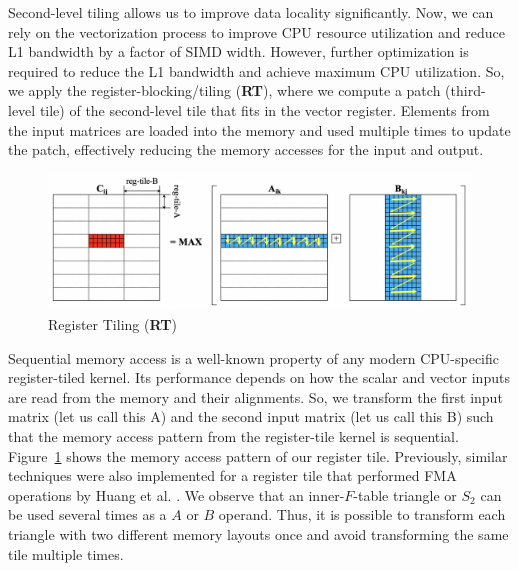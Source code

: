 
Second-level tiling allows us to improve data locality significantly. Now, we can rely on the vectorization process to improve CPU resource utilization and reduce L1 bandwidth by a factor of SIMD width. However, further optimization is required to reduce the L1 bandwidth and achieve maximum CPU utilization. So, we apply the register-blocking/tiling (\textbf{RT}), where we compute a patch (third-level tile) of the second-level tile that fits in the vector register. Elements from the input matrices are loaded into the memory and used multiple times to update the patch, effectively reducing the memory accesses for the input and output.

\begin{figure}[htbp]
\centerline{\includegraphics[scale=0.25, trim=5 5 5 5,clip]{content/figures/register_tile.png}}
\caption{Register Tiling (\textbf{RT})}
\label{fig:regiser_tile}
\end{figure}

Sequential memory access is a well-known property of any modern CPU-specific register-tiled kernel. Its performance depends on how the scalar and vector inputs are read from the memory and their alignments. So, we transform the first input matrix (let us call this A) and the second input matrix (let us call this B) such that the memory access pattern from the register-tile kernel is sequential. Figure~\ref{fig:regiser_tile} shows the memory access pattern of our register tile. Previously, similar techniques were also implemented for a register tile that performed FMA operations by Huang et al. \cite{FLAWN80}. We observe that an inner-$F$-table triangle or $S_{2}$ can be used several times as a $A$ or $B$ operand. Thus, it is possible to transform each triangle with two different memory layouts once and avoid transforming the same tile multiple times. 

